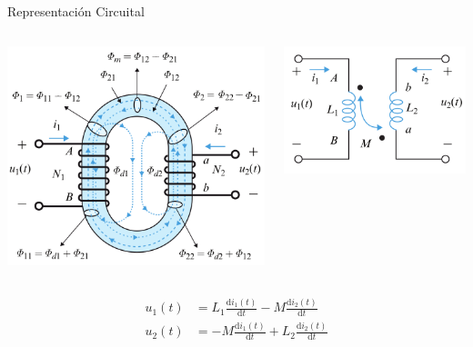 \documentclass[xcolor={usenames,svgnames,dvipsnames}]{beamer}
\begin{document}
\begin{frame}[label={sec:org8f01d7a}]{Representación Circuital}
\begin{columns}
\begin{column}{0.5\columnwidth}
\begin{center}
\includegraphics[height=0.45\textheight]{figs/Acoplamiento2.png}
\end{center}
\end{column}

\begin{column}{0.5\columnwidth}
\begin{center}
\includegraphics[height=0.45\textheight]{figs/Acoplamiento2_circuito.png}
\end{center}
\end{column}
\end{columns}
\begin{align*}
  u_1(t) &= L_1 \frac{\mathrm{d}i_1(t)}{\mathrm{d}t} - M \frac{\mathrm{d}i_2(t)}{\mathrm{d}t}\\
  u_2(t) &= - M \frac{\mathrm{d}i_1(t)}{\mathrm{d}t} + L_2 \frac{\mathrm{d}i_2(t)}{\mathrm{d}t}
\end{align*}
\end{frame}
\end{document}
